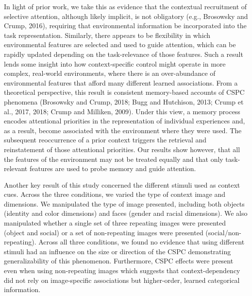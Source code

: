 \documentclass[]{DissertateCUNY}
\begin{document}
In light of prior work, we take this as evidence that the contextual
recruitment of selective attention, although likely implicit, is not
obligatory (e.g., Brosowsky and Crump, 2016), requiring that
environmental information be incorporated into the task representation.
Similarly, there appears to be flexibility in which environmental
features are selected and used to guide attention, which can be rapidly
updated depending on the task-relevance of those features. Such a result
lends some insight into how context-specific control might operate in
more complex, real-world environments, where there is an over-abundance
of environmental features that afford many different learned
associations. From a theoretical perspective, this result is consistent
memory-based accounts of CSPC phenomena (Brosowsky and Crump, 2018; Bugg
and Hutchison, 2013; Crump et al., 2017, 2018; Crump and Milliken,
2009). Under this view, a memory process encodes attentional priorities
in the representation of individual experiences and, as a result, become
associated with the environment where they were used. The subsequent
reoccurrence of a prior context triggers the retrieval and reinstatement
of those attentional priorities. Our results show however, that all the
features of the environment may not be treated equally and that only
task-relevant features are used to probe memory and guide attention.

Another key result of this study concerned the different stimuli used as
context cues. Across the three conditions, we varied the type of context
image and dimensions. We manipulated the type of image presented,
including both objects (identity and color dimensions) and faces (gender
and racial dimensions). We also manipulated whether a single set of
three repeating images were presented (object and social) or a set of
non-repeating images were presented (social/non-repeating). Across all
three conditions, we found no evidence that using different stimuli had
an influence on the size or direction of the CSPC demonstrating
generalizability of this phenomenon. Furthermore, CSPC effects were
present even when using non-repeating images which suggests that
context-dependency did not rely on image-specific associations but
higher-order, learned categorical information.
\end{document}
